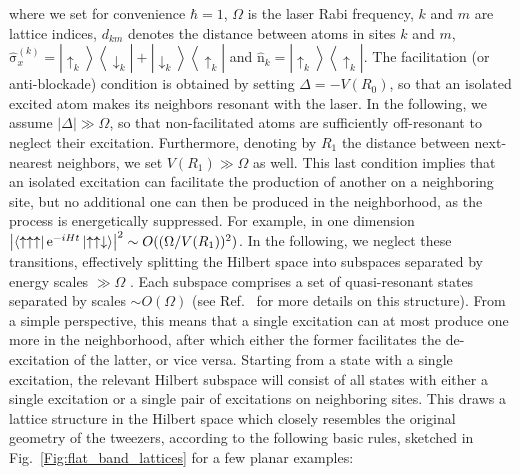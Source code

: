 \documentclass[prl,aps,twocolumn,showpacs,superscriptaddress,longbibliography]{revtex4-1}
\newcommand{\rme}[1]{{\rm{e}}^{#1}}
\newcommand{\lan}{\left\langle}
\newcommand{\ran}{\right\rangle}
\newcommand{\abs}[1]{\left| #1 \right|}
\newcommand{\ket}[1]{\left| #1 \ran}
\newcommand{\bra}[1]{\lan #1 \right|}
\newcommand{\proj}[1]{\ket{#1} \bra{#1}}
\newcommand{\up}{\uparrow}
\newcommand{\down}{\downarrow}
\newcommand{\op}[1]{\mathrm{\hat{#1}}}
\begin{document}
where we set for convenience $\hbar=1$, $\Omega$ is the laser Rabi frequency, $k$ and $m$ are lattice indices, $d_{km}$ denotes the distance between atoms in sites $k$ and $m$, $\op{\sigma}_x^{(k)} = \ket{\up_k} \bra{\down_k} + \ket{\down_k} \bra{\up_k}$ and $\op{n}_k = \proj{\up_k}$. The facilitation (or anti-blockade) condition is obtained by setting $\Delta = -V(R_0)$, so that an isolated excited atom makes its neighbors resonant with the laser. In the following, we assume $\abs{\Delta} \gg \Omega$, so that non-facilitated atoms are sufficiently off-resonant to neglect their excitation. Furthermore, denoting by $R_1$ the distance between next-nearest neighbors, we set $V(R_1) \gg \Omega$ as well. This last condition implies that an isolated excitation can facilitate the production of another on a neighboring site, but no additional one can then be produced in the neighborhood, as the process is energetically suppressed. For example, in one dimension $\abs{\bra{\up \up \up} \rme{-iHt} \ket{\up \up \down}}^2 \sim O((\Omega / V(R_1))^2)$. In the following, we neglect these transitions, effectively splitting the Hilbert space into subspaces separated by energy scales $\gg \Omega$ . Each subspace comprises a set of quasi-resonant states separated by scales $\sim O(\Omega)$ (see Ref.~\cite{a_Marcuzzi_PRL_17} for more details on this structure). From a simple perspective, this means that a single excitation can at most produce one more in the neighborhood, after which either the former facilitates the de-excitation of the latter, or vice versa. Starting from a state with a single excitation, the relevant Hilbert subspace will consist of all states with either a single excitation or a single pair of excitations on neighboring sites. This draws a lattice structure in the Hilbert space which closely resembles the original geometry of the tweezers, according to the following basic rules, sketched in Fig.~\ref{Fig:flat_band_lattices} for a few planar examples:  
\end{document}
